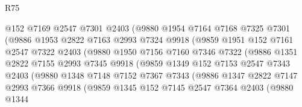 \begin{lexlean}{R75}
\begin{coremodule}
                        @152
                        @7169
                        @2547
                        @7301
                        @2403
                        (@9880
                          @1954
                          @7164
                          @7168
                          @7325
                          @7301
                          (@9886
                            @1953
                            @2822
                            @7163
                            @2993
                            @7324
                            @9918
                            (@9859
                              @1951
                              @152
                              @7161
                              @2547
                              @7322
                              @2403
                              (@9880
                                @1950
                                @7156
                                @7160
                                @7346
                                @7322
                                (@9886
                                  @1351
                                  @2822
                                  @7155
                                  @2993
                                  @7345
                                  @9918
                                  (@9859
                                    @1349
                                    @152
                                    @7153
                                    @2547
                                    @7343
                                    @2403
                                    (@9880
                                      @1348
                                      @7148
                                      @7152
                                      @7367
                                      @7343
                                      (@9886
                                        @1347
                                        @2822
                                        @7147
                                        @2993
                                        @7366
                                        @9918
                                        (@9859
                                          @1345
                                          @152
                                          @7145
                                          @2547
                                          @7364
                                          @2403
                                          (@9880
                                            @1344

\end{coremodule}
\end{lexlean}
